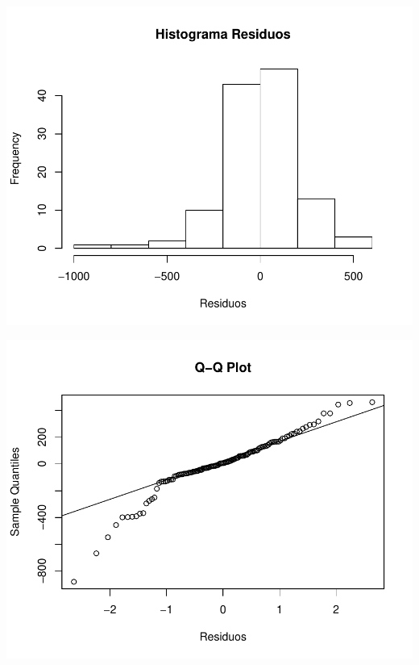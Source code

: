 \documentclass[11pt,a4paper,oneside]{article}\usepackage[]{graphicx}\usepackage[]{color}
\makeatletter
\def\maxwidth{ %
  \ifdim\Gin@nat@width>\linewidth
    \linewidth
  \else
    \Gin@nat@width
  \fi
}
\newenvironment{knitrout}{}{} %
\makeatother
\begin{document}
\begin{knitrout}
{\centering \includegraphics[width=\maxwidth]{figure/unnamed-chunk-16-53} 

}




{\centering \includegraphics[width=\maxwidth]{figure/unnamed-chunk-16-54} 

}





\end{knitrout}
\end{document}

